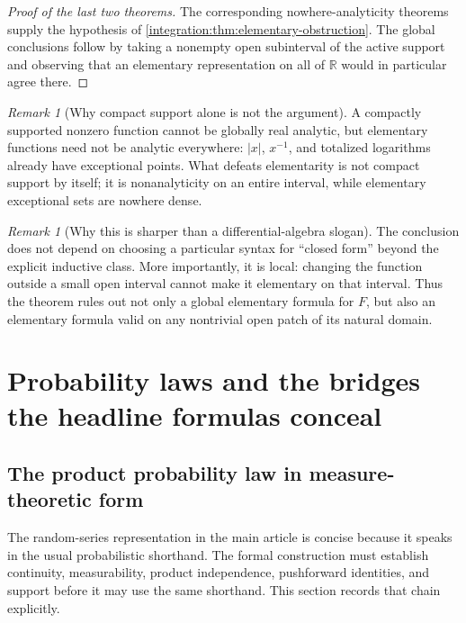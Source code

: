 \documentclass[11pt,oneside]{article}
\theoremstyle{definition}
\theoremstyle{remark}
\newtheorem{remark}[theorem]{Remark}
\newcommand{\R}{\mathbb R}
\begin{document}
\begin{proof}[Proof of the last two theorems]
The corresponding nowhere-analyticity theorems supply the hypothesis of
\cref{integration:thm:elementary-obstruction}.  The global conclusions follow by taking a nonempty open
subinterval of the active support and observing that an elementary representation on all of
$\R$ would in particular agree there.
\end{proof}

\begin{remark}[Why compact support alone is not the argument]
A compactly supported nonzero function cannot be globally real analytic, but elementary
functions need not be analytic everywhere: $|x|$, $x^{-1}$, and totalized logarithms already
have exceptional points.  What defeats elementarity is not compact support by itself; it is
nonanalyticity on an entire interval, while elementary exceptional sets are nowhere dense.
\end{remark}

\begin{remark}[Why this is sharper than a differential-algebra slogan]
The conclusion does not depend on choosing a particular syntax for ``closed form'' beyond
the explicit inductive class.  More importantly, it is local: changing the function outside
a small open interval cannot make it elementary on that interval.  Thus the theorem rules
out not only a global elementary formula for $F$, but also an elementary formula valid on
any nontrivial open patch of its natural domain.
\end{remark}

\section{Probability laws and the bridges the headline formulas conceal}

\subsection{The product probability law in measure-theoretic form}
\label{integration:sec:product-law}

The random-series representation in the main article is concise because it speaks in the
usual probabilistic shorthand.  The formal construction must establish continuity,
measurability, product independence, pushforward identities, and support before it may use
the same shorthand.  This section records that chain explicitly.
\end{document}

